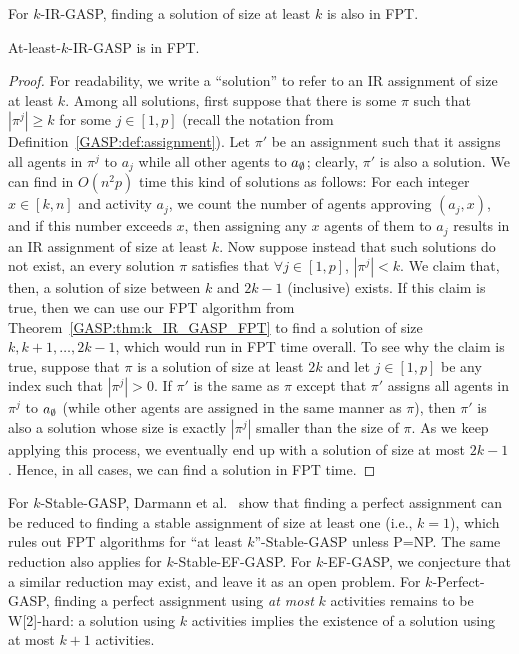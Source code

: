 For $k$-IR-GASP, finding a solution of size at least $k$ is also in FPT.
\begin{theorem} \label{GASP:thm:k_IR_GASP_FPT_atleast}
At-least-$k$-IR-GASP is in FPT. 
\end{theorem}
\vspace{-1em}\begin{proof}
	For readability, we write a ``solution'' to refer to an IR assignment of size at least $k$.
	Among all solutions, first suppose that there is some $\pi$ such that $|\pi^j| \geq k$ for some $j \in [1,p]$ (recall the notation from Definition~\ref{GASP:def:assignment}). Let $\pi'$ be an assignment such that it assigns all agents in $\pi^j$ to $a_j$ while all other agents to $a_{\emptyset}$; clearly, $\pi'$ is also a solution. We can find in $O(n^2p)$ time this kind of solutions as follows: For each integer $x\in [k, n]$ and activity $a_j$, we count the number of agents approving $(a_j, x)$, and if this number exceeds $x$, then assigning any $x$ agents of them to $a_j$ results in an IR assignment of size at least $k$.
	Now suppose instead that such solutions do not exist, an every solution $\pi$ satisfies that $\forall j\in [1, p]$, $|\pi^j| < k$. We claim that, then, a solution of size between $k$ and $2k-1$ (inclusive) exists. If this claim is true, then we can use our FPT algorithm from Theorem~\ref{GASP:thm:k_IR_GASP_FPT} to find a solution of size $k, k+1, \dots, 2k-1$, which would run in FPT time overall. To see why the claim is true, suppose that $\pi$ is a solution of size at least $2k$ and let $j \in [1,p]$ be any index such that $|\pi^j| > 0$. If $\pi'$ is the same as $\pi$ except that $\pi'$ assigns all agents in $\pi^j$ to $a_{\emptyset}$ (while other agents are assigned in the same manner as $\pi$), then $\pi'$ is also a solution whose size is exactly $|\pi^j|$ smaller than the size of $\pi$. As we keep applying this process, we eventually end up with a solution of size at most $2k-1$. Hence, in all cases, we can find a solution in FPT time. 
\end{proof}\vspace{-.5em}


For $k$-Stable-GASP, Darmann et al.~\cite{GASP12WINE} show that finding a perfect assignment can be reduced to finding a stable assignment of size at least one (i.e., $k=1$), which rules out FPT algorithms for ``at least $k$''-Stable-GASP unless P=NP. The same reduction also applies for $k$-Stable-EF-GASP.
For $k$-EF-GASP, we conjecture that a similar reduction may exist, and leave it as an open problem.
For $k$-Perfect-GASP, finding a perfect assignment using {\em at most} $k$ activities remains to be W[2]-hard: a solution using $k$ activities implies the existence of a solution using at most $k+1$ activities.





